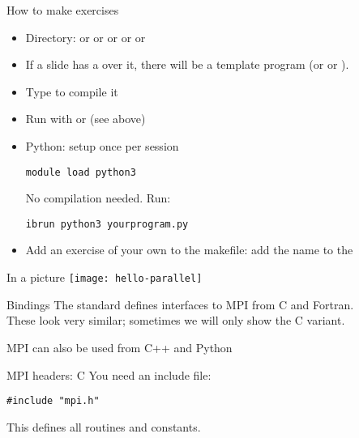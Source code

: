 \begin{numberedframe}{How to make exercises}
  \begin{itemize}
  \item Directory:  or  or  or 
    or  or 
  \item If a slide has a  over it, there will be a
    template program  (or  or ).
  \item Type  to compile it
  \item Run with  or  (see above)
  \item Python: setup once per session
\begin{verbatim}
module load python3
\end{verbatim}
No compilation needed. Run:
\begin{verbatim}
ibrun python3 yourprogram.py
\end{verbatim}
\item Add an exercise of your own to the makefile: add the name to
    the 
  \end{itemize}
\end{numberedframe}

\begin{exerciseframe}[hello]
  
\end{exerciseframe}

\begin{numberedframe}{In a picture}
  \texttt{[image: hello-parallel]}
\end{numberedframe}


\begin{numberedframe}{Bindings}
  The standard defines interfaces to MPI
  from C and Fortran.\\
  These look very similar;
  sometimes we will only show the C variant.

  MPI can also be used from C++ and Python
\end{numberedframe}

\begin{numberedframe}{MPI headers: C}
\label{sl:mpi-header-c}
You need an include file:
\begin{verbatim}
#include "mpi.h"
\end{verbatim}
This defines all routines and constants.
\end{numberedframe}

